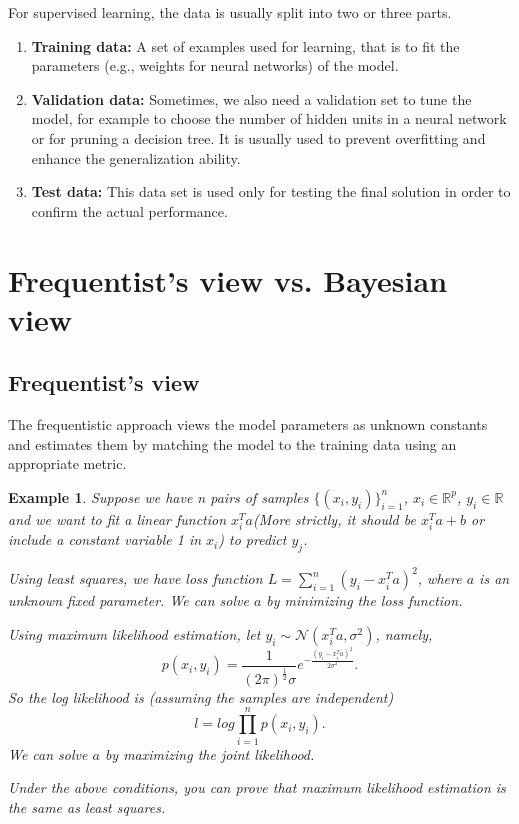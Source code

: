 \documentclass[11pt]{article}
\def\MN{{\mathcal N}}
\def\BR{{\mathbb R}}
\newtheorem{example}{Example}[section]
\begin{document}
For supervised learning, the data is usually split into two or three parts.
\begin{enumerate}[(1)]
\item \textbf{Training data:} A set of examples used for learning, that is to fit the parameters (e.g., weights for neural networks) of the model. 
\item \textbf{Validation data:}  Sometimes, we also need a validation set to tune the model, for example to choose the number of hidden units in a neural network or for pruning a decision tree. It is usually used to prevent overfitting and enhance the generalization ability.
\item \textbf{Test data:} This data set is used only for testing the final solution in order to confirm the actual performance.  
\end{enumerate}

\section{Frequentist's view vs. Bayesian view}
\subsection{Frequentist's view}
The frequentistic approach views the model parameters as unknown constants and estimates them by matching the model to the training data using an appropriate metric.

\begin{example}
Suppose we have n pairs of samples $\{(x_i, y_i)\}_{i=1}^{n}$, $x_i \in \BR^p$, $y_i \in \BR$ and we want to fit a linear function $x_i^Ta$(More strictly, it should be $x_i^T a+b$ or include a constant variable 1 in $x_i$) to predict $y_j$.

Using least squares, we have loss function $L = \sum_{i=1}^n (y_i - x_i^T a)^2$, where $a$ is an unknown fixed parameter. We can solve $a$ by minimizing the loss function.

Using maximum likelihood estimation, let $y_i \sim \MN(x_i^T a, \sigma^2)$, namely, $$p(x_i,y_i)=\frac{1}{(2\pi)^{\frac{1}{2}}\sigma}e^{-\frac{(y_i-x_i^Ta)^2}{2\sigma^2}}.$$ So the log likelihood is (assuming the samples are independent) $$l=log \prod_{i=1}^{n}p(x_i,y_i).$$We can solve $a$ by maximizing the joint likelihood.

Under the above conditions, you can prove that maximum likelihood estimation is the same as least squares.
\end{example}
\end{document}
